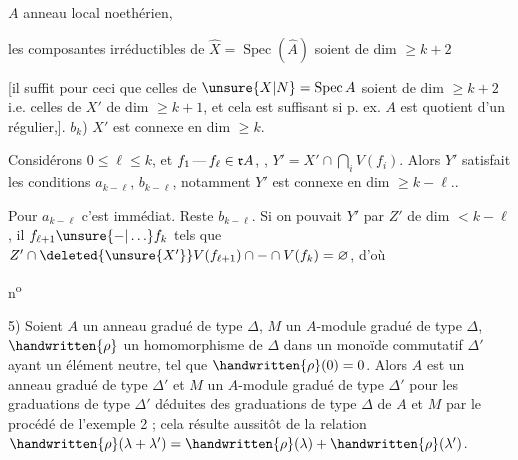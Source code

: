  \quad $A$ anneau local noethérien, 

  les composantes irréductibles de $\widehat X=\operatorname{Spec}(\widehat A)$ soient de dim $\geq k+2$

[il suffit pour ceci que celles de $\unsure{X|N}=\operatorname{Spec} A$ soient de dim $\geq k+2$ i.e. celles de $X'$ de dim $\geq k+1$, et cela est suffisant si p. ex. $A$ est quotient d'un régulier,].  $b_k$) $X'$ est connexe en dim $\geq k$.

Considérons  $0\leq\ell\leq k$, et $f_1\mathinner{\text{---}}f_\ell\in\mathfrak rA$, , $Y'=X'\cap\bigcap\limits_i V(f_i)$. Alors  $Y'$ satisfait les conditions $a_{k-\ell}$, $b_{k-\ell}$, notamment $Y'$ est connexe en dim $\geq k-\ell$..

Pour $a_{k-\ell}$ c'est immédiat. Reste $b_{k-\ell}$. Si on pouvait  $Y'$ par $Z'$ de dim $<k-\ell$, il   $f_{\ell+1}\unsure{-|\ldots}f_k$ tels que $Z'\cap\deleted{\unsure{X'}}V(f_{\ell+1})\cap-\cap V(f_k)=\varnothing$, d'où 

\begin{flushright}
n\textsuperscript{o}
\end{flushright}

5) Soient $A$ un anneau gradué de type $\Delta$, $M$ un $A$-module gradué de type $\Delta$, $\handwritten{\rho}$ un homomorphisme de $\Delta$ dans un monoïde commutatif $\Delta'$ ayant un élément neutre, tel que $\handwritten{\rho}(0)=0$. Alors $A$ est un anneau gradué de type $\Delta'$ et $M$ un $A$-module gradué de type $\Delta'$ pour les graduations de type $\Delta'$ déduites des graduations de type $\Delta$ de $A$ et $M$ par le procédé de l'exemple 2 ; cela résulte aussitôt de la relation $\handwritten{\rho}(\lambda+\lambda')=\handwritten{\rho}(\lambda)+\handwritten{\rho}(\lambda')$.

